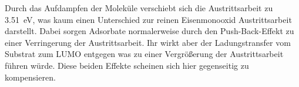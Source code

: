         Durch das Aufdampfen der Moleküle verschiebt sich die Austrittsarbeit zu \SI{3.51}{\electronvolt}, was kaum einen Unterschied zur reinen Eisenmonooxid Austrittsarbeit darstellt.
        Dabei sorgen Adsorbate normalerweise durch den Push-Back-Effekt zu einer Verringerung der Austrittsarbeit.
        Ihr wirkt aber der Ladungstransfer vom Substrat zum LUMO entgegen was zu einer Vergrößerung der Austrittsarbeit führen würde.
        Diese beiden Effekte scheinen sich hier gegenseitig zu kompensieren.

  

